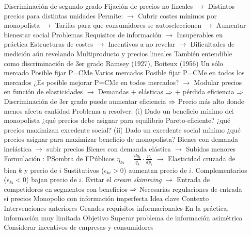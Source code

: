 \documentclass{nuevotema}
\begin{document}
\begin{esquemal}
				\4 Discriminación de segundo grado
				\4[] Fijación de precios no lineales
				\4[] $\to$ Distintos precios para distintas unidades
				\4[] Permite:
				\4[] $\to$ Cubrir costes mínimos por monopolista
				\4[] $\to$ Tarifas para que consumidores se autoseleccionen
				\4[] $\to$ Aumentar bienestar social
				\4 Problemas
				\4[] Requisitos de información
				\4[] $\to$ Insuperables en práctica
				\4[] Estructuras de costes
				\4[] $\to$ Incentivos a no revelar
				\4[] $\to$ Dificultades de medición aún revelando
			\3 Multiproducto y precios lineales
				\4 También entendible como discriminación de 3er grado
				\4 Ramsey (1927), Boiteux (1956)
				\4 Un sólo mercado
				\4[] Posible fijar P=CMe
				\4 Varios mercados
				\4[] Posible fijar P=CMe en todos los mercados
				\4 ¿Es posible mejorar P=CMe en todos mercados?
				\4[] $\to$ Modular precios en función de elasticidades
				\4[] $\to$ Demandas + elásticas $\then$ + pérdida eficiencia
				\4[] $\then$ Discriminación de 3er grado puede aumentar eficiencia
				\4[] $\then$ Precio más alto donde menos afecta cantidad
				\4 Problema a resolver:
				\4[] (i) Dado un beneficio mínimo del monopolista
				\4[] ¿qué precios debe asignar para equilibrio Pareto-eficiente?
				\4[] ¿qué precios maximizan excedente social?
				\4[] (ii) Dado un excedente social mínimo
				\4[] ¿qué precios asignar para maximizar beneficio de monopolista?
				\4 Bienes con demanda inelástica
				\4[] $\to$ subir precios
				\4 Bienes con demanda elástica
				\4[] $\to$ Subidas menores
				\4 Formulación
				\4[] 
				\4[] : PSombra de FPúblicos
				\4[] $\eta_{ki} = \frac{d q_k}{q_k} \cdot \frac{p_i}{d p_i}$
				\4[] $\to$ Elasticidad cruzada de bien $k$ y precio de $i$
				\4[$\then$] Sustitutivos ($\epsilon_{ki} > 0$) aumentan precio de $i$.
				\4[$\then$] Complementarios ($\epsilon_{ki} <0$) bajan precio de $i$.
				\4[] Evitar el \textit{cream skimming}
				\4[] $\to$ Entrada de competidores en segmentos con beneficios
				\4[] $\then$ Necesarias regulaciones de entrada si precios
		\2 Monopolio con información imperfecta
			\3 Idea clave
				\4 Contexto
				\4[] Intervenciones anteriores
				\4[] Grandes requisitos informacionales
				\4[] En la práctica, información muy limitada
				\4 Objetivo
				\4[] Superar problema de información asimétrica
				\4[] Considerar incentivos de empresas y consumidores

\end{esquemal}
\end{document}
